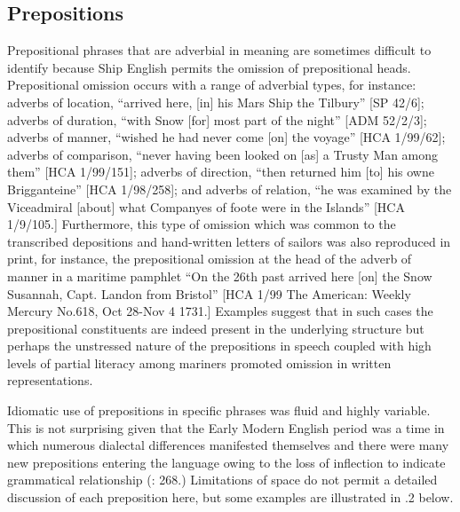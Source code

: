 \subsection{{Prepositions} }%

Prepositional phrases that are adverbial in meaning are sometimes difficult to identify because Ship English permits the omission of prepositional heads. Prepositional omission occurs with a range of adverbial types, for instance: adverbs of location, “arrived here, [in] his Mars Ship the Tilbury” [SP 42/6]; adverbs of duration, “with Snow [for] most part of the night” [ADM 52/2/3]; adverbs of manner, “wished he had never come [on] the voyage” [HCA 1/99/62]; adverbs of comparison, “never having been looked on [as] a Trusty Man among them” [HCA 1/99/151]; adverbs of direction, “then returned him [to] his owne Brigganteine” [HCA 1/98/258]; and adverbs of relation, “he was examined by the Viceadmiral [about] what Companyes of foote were in the Islands” [HCA 1/9/105.] Furthermore, this type of omission which was common to the transcribed depositions and hand-written letters of sailors was also reproduced in print, for instance, the prepositional omission at the head of the adverb of manner in a maritime pamphlet “On the 26th past arrived here [on] the Snow Susannah, Capt. Landon from Bristol” [HCA 1/99 The American: Weekly Mercury No.618, Oct 28-Nov 4 1731.] Examples suggest that in such cases the prepositional constituents are indeed present in the underlying structure but perhaps the unstressed nature of the prepositions in speech coupled with high levels of partial literacy among mariners promoted omission in written representations. 

  Idiomatic use of prepositions in specific phrases was fluid and highly variable. This is not surprising given that the Early Modern English period was a time in which numerous dialectal differences manifested themselves and there were many new prepositions entering the language owing to the loss of inflection to indicate grammatical relationship (\citealt{MillwardHayes2012}: 268.) Limitations of space do not permit a detailed discussion of each preposition here, but some examples are illustrated in .2 below. 


